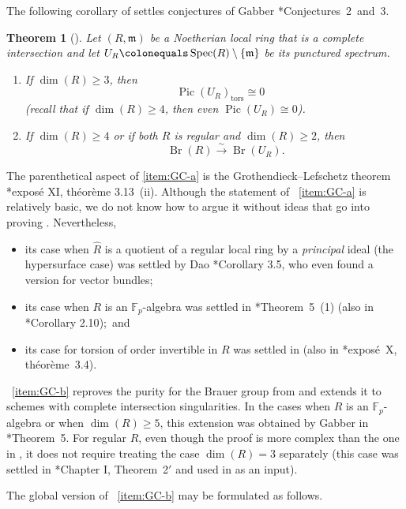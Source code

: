 \documentclass[11pt, reqno]{amsart}
\newcommand{\bF}{\mathbb{F}}
\newcommand{\fm}{\mathfrak{m}}
\DeclareMathOperator{\Br}{Br}			%
\DeclareMathOperator{\Pic}{Pic}		%
\DeclareMathOperator{\Spec}{Spec}		%
\newcommand{\ce}{\colonequals}
\newcommand{\et}{\mathrm{\acute{e}t}}	%
\newcommand{\isomto}{\overset{\sim}{\longrightarrow}}
\newcommand{\tors}{\mathrm{tors}}		%
\newcommand{\wh}{\widehat}
\providecommand{\up}[1]{{\upshape(}#1{\upshape)}}
\newcommand{\m}{\item}
\newcommand{\benum}{\begin{enumerate}[label={{\upshape(\alph*)}}]}
\newcommand{\eenum}{\end{enumerate}}
\newcommand{\lab}{\label}
\newcommand{\q}{\quad}
\newcommand{\qq}{\quad\quad}
\newcommand{\bthm}{\begin{thm}}
\newcommand{\ethm}{\end{thm}}
\numberwithin{equation}{numberingbase}
\theoremstyle{thms}
\newtheorem{thm}[numberingbase]{Theorem}
\theoremstyle{claims}
\theoremstyle{defs}
\theoremstyle{thms}
\theoremstyle{defs}
\theoremstyle{subsection-tweak}
\theoremstyle{subsection-tweak}
\begin{document}
The following corollary of  settles conjectures of Gabber \cite{Gab04}*{Conjectures~2~and~3}.

\bthm[] \label{thm:Gabber-conjectures}
Let $(R, \fm)$ be a Noetherian local ring  that is a complete intersection and let $U_R \ce \Spec(R) \setminus \{ \fm\}$ be its punctured spectrum.
\benum
\item \lab{item:GC-a}
If $\dim(R) \ge 3$, then 
\[
\q\Pic(U_R)_\tors \cong 0
\]
\up{recall that if $\dim(R) \ge 4$, then even $\Pic(U_R) \cong 0$}.

\item \lab{item:GC-b}
If $\dim(R) \ge 4$ or if both $R$ is regular and $\dim(R) \ge 2$, then 
\[
\qq\Br(R) \isomto \Br(U_R).
\]
\eenum
\ethm

The parenthetical aspect of \ref{item:GC-a} is the Grothendieck--Lefschetz theorem \cite{SGA2new}*{expos\'{e} XI, th\'{e}or\`{e}me 3.13~(ii)}. Although the statement of ~\ref{item:GC-a} is relatively basic, we do not know how to argue it without ideas that go into proving . Nevertheless, 
\begin{itemize}
\m
its case when $\wh{R}$ is a quotient of a regular local ring by a \emph{principal} ideal (the hypersurface case) was settled by Dao \cite{Dao12}*{Corollary 3.5}, who even found a version for vector bundles; 

\m
its case when $R$ is an $\bF_p$-algebra was settled in \cite{Gab04}*{Theorem~5~(1)} (also in \cite{DLM10}*{Corollary 2.10});~and 

\m
its case for torsion of order invertible in $R$ was settled in \cite{Rob76} (also in %
\cite{SGA2new}*{expos\'{e}~X, th\'{e}or\`{e}me~3.4}). 
\end{itemize}


~\ref{item:GC-b} reproves the purity for the Brauer group from \cite{brauer-purity} and extends it to schemes with complete intersection singularities. In the cases when $R$ is an $\bF_p$-algebra or when $\dim(R) \ge 5$, this extension was obtained by Gabber in \cite{Gab04}*{Theorem~5}. For regular $R$, even though  the proof is more complex than the one in \cite{brauer-purity}, it does not require treating the case $\dim(R) = 3$ separately (this case was settled in \cite{Gab81}*{Chapter I, Theorem~2$'$} and used in \cite{brauer-purity} as an input).

The global version of ~\ref{item:GC-b} may be formulated as follows.
\end{document}
